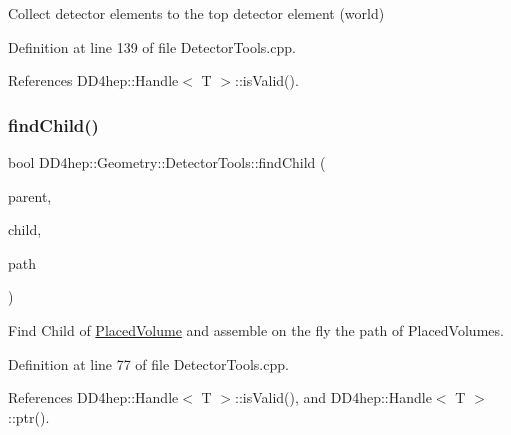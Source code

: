Collect detector elements to the top detector element (world) 



Definition at line 139 of file Detector\+Tools.\+cpp.



References D\+D4hep\+::\+Handle$<$ T $>$\+::is\+Valid().

\hypertarget{namespace_d_d4hep_1_1_geometry_1_1_detector_tools_a1bb51943ab0395ee0b1e4441b6a6b92a}{}\label{namespace_d_d4hep_1_1_geometry_1_1_detector_tools_a1bb51943ab0395ee0b1e4441b6a6b92a} 
\subsubsection{\texorpdfstring{find\+Child()}{findChild()}}
{\footnotesize\ttfamily bool D\+D4hep\+::\+Geometry\+::\+Detector\+Tools\+::find\+Child (\begin{DoxyParamCaption}\item[{\hyperlink{class_d_d4hep_1_1_geometry_1_1_placed_volume}{Placed\+Volume}}]{parent,  }\item[{\hyperlink{class_d_d4hep_1_1_geometry_1_1_placed_volume}{Placed\+Volume}}]{child,  }\item[{\hyperlink{namespace_d_d4hep_1_1_geometry_1_1_detector_tools_a6cc33285199e04dd336a33e6e62925e6}{Placement\+Path} \&}]{path }\end{DoxyParamCaption})}



Find Child of \hyperlink{class_d_d4hep_1_1_geometry_1_1_placed_volume}{Placed\+Volume} and assemble on the fly the path of Placed\+Volumes. 



Definition at line 77 of file Detector\+Tools.\+cpp.



References D\+D4hep\+::\+Handle$<$ T $>$\+::is\+Valid(), and D\+D4hep\+::\+Handle$<$ T $>$\+::ptr().

\hypertarget{namespace_d_d4hep_1_1_geometry_1_1_detector_tools_a142393e7b88829aee063f35a8e7cb984}{}\label{namespace_d_d4hep_1_1_geometry_1_1_detector_tools_a142393e7b88829aee063f35a8e7cb984} 
